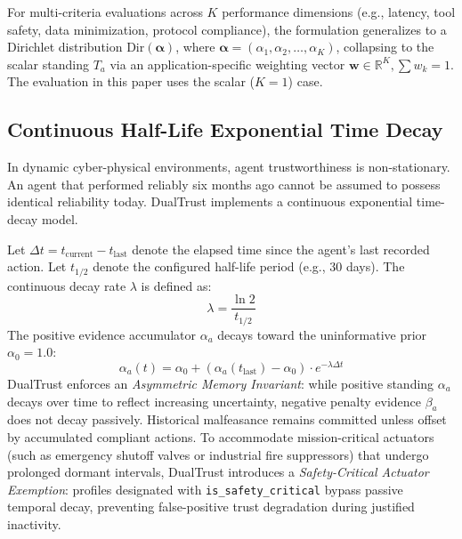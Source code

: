 \documentclass[manuscript, screen, review]{jair}
\begin{document}
For multi-criteria evaluations across $K$ performance dimensions (e.g., latency, tool safety, data minimization, protocol compliance), the formulation generalizes to a Dirichlet distribution $\text{Dir}(\boldsymbol{\alpha})$, where $\boldsymbol{\alpha} = (\alpha_1, \alpha_2, \dots, \alpha_K)$, collapsing to the scalar standing $T_a$ via an application-specific weighting vector $\mathbf{w} \in \mathbb{R}^K, \sum w_k = 1$. The evaluation in this paper uses the scalar ($K=1$) case.

\subsection{Continuous Half-Life Exponential Time Decay}
In dynamic cyber-physical environments, agent trustworthiness is non-stationary. An agent that performed reliably six months ago cannot be assumed to possess identical reliability today. DualTrust implements a continuous exponential time-decay model.

Let $\Delta t = t_{\text{current}} - t_{\text{last}}$ denote the elapsed time since the agent's last recorded action. Let $t_{1/2}$ denote the configured half-life period (e.g., 30 days). The continuous decay rate $\lambda$ is defined as:
\begin{equation}
\lambda = \frac{\ln 2}{t_{1/2}}
\end{equation}
The positive evidence accumulator $\alpha_a$ decays toward the uninformative prior $\alpha_0 = 1.0$:
\begin{equation}
\alpha_a(t) = \alpha_0 + (\alpha_a(t_{\text{last}}) - \alpha_0) \cdot e^{-\lambda \Delta t}
\label{eq:decay}
\end{equation}
DualTrust enforces an \emph{Asymmetric Memory Invariant}: while positive standing $\alpha_a$ decays over time to reflect increasing uncertainty, negative penalty evidence $\beta_a$ does not decay passively. Historical malfeasance remains committed unless offset by accumulated compliant actions. To accommodate mission-critical actuators (such as emergency shutoff valves or industrial fire suppressors) that undergo prolonged dormant intervals, DualTrust introduces a \emph{Safety-Critical Actuator Exemption}: profiles designated with \texttt{is\_safety\_critical} bypass passive temporal decay, preventing false-positive trust degradation during justified inactivity.
\end{document}
